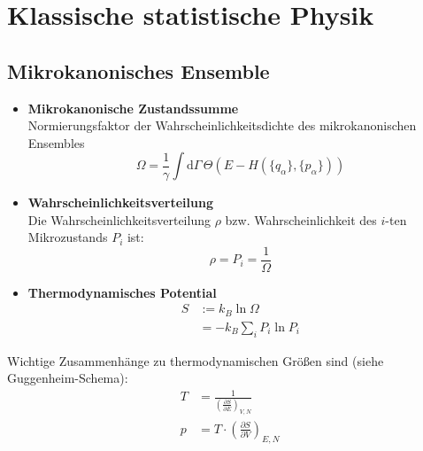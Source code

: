 \documentclass{article}
\newcommand{\diff}{\mathrm{d}}
\newcommand{\lr}[1]{\left(#1\right)}
\begin{document}
\newpage


\section{Klassische statistische Physik}
\subsection{Mikrokanonisches Ensemble}
	\begin{itemize}
		\item \textbf{Mikrokanonische Zustandssumme}\\
		Normierungsfaktor der Wahrscheinlichkeitsdichte des mikrokanonischen Ensembles
			\begin{equation}
				\Omega = \frac{1}{\gamma}\int \diff\Gamma\, \Theta\lr{ E - H(\{q_\alpha\}, \{p_\alpha\}) }
			\end{equation}
		
		
		\item \textbf{Wahrscheinlichkeitsverteilung}\\
		Die Wahrscheinlichkeitsverteilung $\rho$ bzw. Wahrscheinlichkeit des $i$-ten Mikrozustands $P_i$ ist:
			\begin{equation}
				\rho = P_i = \frac{1}{\Omega}
			\end{equation}
		
		
		\item \textbf{Thermodynamisches Potential}
			\begin{align}
				S &:= k_B \ln \Omega \\ 
				&= -k_B \sum_i P_i \ln P_i
			\end{align}
	\end{itemize}

Wichtige Zusammenhänge zu thermodynamischen Größen sind (siehe Guggenheim-Schema):
	\begin{align}
		T &= \frac{1}{\lr{ \frac{\partial S}{\partial E} }_{V,N}} \\
		p &= T\cdot \lr{ \frac{\partial S}{\partial V} }_{E,N}
	\end{align}


\newpage
\end{document}

